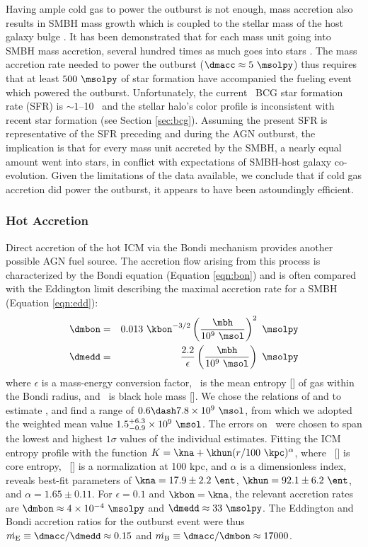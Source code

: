 \documentclass[11pt, preprint]{aastex}
\begin{document}
Having ample cold gas to power the outburst is not enough, mass
accretion also results in SMBH mass growth which is coupled to the
stellar mass of the host galaxy bulge \citep{1995ARA&A..33..581K}. It
has been demonstrated that for each mass unit going into SMBH mass
accretion, several hundred times as much goes into stars
\citep{magorrian}. The mass accretion rate needed to power the
outburst ($\dmacc \approx 5 ~\msolpy$) thus requires that at least
$500 ~\msolpy$ of star formation have accompanied the fueling event
which powered the outburst. Unfortunately, the current \rbs\ BCG star
formation rate (SFR) is $\sim 1$--10 \msolpy\ and the stellar halo's
color profile is inconsistent with recent star formation (see Section
\ref{sec:bcg}). Assuming the present SFR is representative of the SFR
preceding and during the AGN outburst, the implication is that for
every mass unit accreted by the SMBH, a nearly equal amount went into
stars, in conflict with expectations of SMBH-host galaxy
co-evolution. Given the limitations of the data available, we conclude
that if cold gas accretion did power the outburst, it appears to have
been astoundingly efficient.

\subsubsection{Hot Accretion}

Direct accretion of the hot ICM via the Bondi mechanism provides
another possible AGN fuel source. The accretion flow arising from this
process is characterized by the Bondi equation (Equation
\ref{eqn:bon}) and is often compared with the Eddington limit
describing the maximal accretion rate for a SMBH (Equation
\ref{eqn:edd}):
\begin{eqnarray}
  \dmbon &=& 0.013 ~\kbon^{-3/2} \left(\frac{\mbh}{10^9
    ~\msol}\right)^{2} ~\msolpy \label{eqn:bon}\\
  \dmedd &=& \frac{2.2}{\epsilon} \left(\frac{\mbh}{10^9~\msol}\right)
  ~\msolpy  \label{eqn:edd}
\end{eqnarray}
where $\epsilon$ is a mass-energy conversion factor, \kbon\ is the
mean entropy [\ent] of gas within the Bondi radius, and \mbh\ is black
hole mass [\msol]. We chose the relations of
\citet{2002ApJ...574..740T} and \citet{2007MNRAS.379..711G} to
estimate \mbh, and find a range of $0.6 \dash 7.8 \times 10^9 ~\msol$,
from which we adopted the weighted mean value $1.5^{+6.3}_{-0.9}
\times 10^9 ~\msol$. The errors on \mbh\ were chosen to span the
lowest and highest $1\sigma$ values of the individual
estimates. Fitting the ICM entropy profile with the function $K = \kna
+\khun (r/100 ~\kpc)^{\alpha}$, where \kna\ [\ent] is core entropy,
\khun\ [\ent] is a normalization at 100 kpc, and $\alpha$ is a
dimensionless index, reveals best-fit parameters of $\kna = 17.9 \pm
2.2 ~\ent$, $\khun = 92.1 \pm 6.2 ~\ent$, and $\alpha = 1.65 \pm
0.11$. For $\epsilon = 0.1$ and $\kbon = \kna$, the relevant accretion
rates are $\dmbon \approx 4 \times 10^{-4} ~\msolpy$ and $\dmedd
\approx 33 ~\msolpy$. The Eddington and Bondi accretion ratios for the
outburst event were thus $\dme \equiv \dmacc/\dmedd \approx 0.15$ and
$\dmb \equiv \dmacc/\dmbon \approx 17000$.
\end{document}
